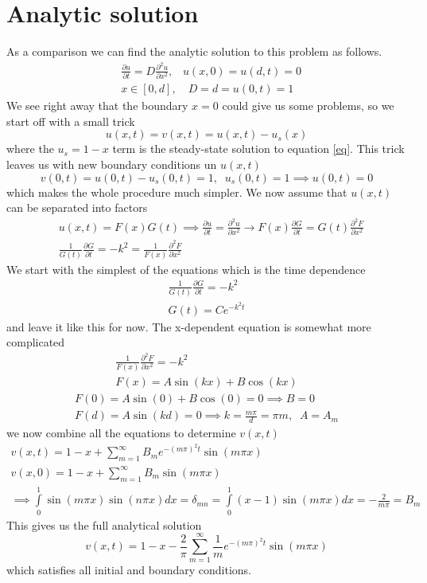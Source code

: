 \documentclass[a4paper,english, 10pt, twoside]{article}
\begin{document}
\section{Analytic solution}
As a comparison we can find the analytic solution to this problem as follows. 
 \begin{align}\label{eq}
  &\frac{\partial u}{\partial t} = D\frac{\partial^2 u}{\partial x^2}, \,\,\,\,\, u(x,0) = u(d,t) = 0\\
  &x\in[0,d],\,\,\,\,\,\, D = d = u(0,t) = 1
 \end{align}
We see right away that the boundary $x=0$ could give us some problems, so we start off with a small trick
$$
u(x,t) = v(x,t) = u(x,t) - u_s(x)
$$
where the $u_s = 1-x$ term is the steady-state solution to equation \ref{eq}. This trick leaves us with new boundary conditions 
un $u(x,t)$ 
$$
v(0,t) = u(0,t) - u_s(0,t) = 1, \;\; u_s(0,t) = 1 \implies u(0,t) = 0
$$
which makes the whole procedure much simpler. We now assume that $u(x,t)$ can be separated into factors 
\begin{align*}
&u(x,t) = F(x)G(t) \implies \frac{\partial u}{\partial t} = \frac{\partial^2 u}{\partial x^2} \to F(x)\frac{\partial G}{\partial t}
= G(t)\frac{\partial^2 F}{\partial x^2}\\
&\frac{1}{G(t)}\frac{\partial G}{\partial t} =-k^2 =  \frac{1}{F(x)}\frac{\partial^2 F}{\partial x^2}
\end{align*}
We start with the simplest of the equations which is the time dependence
\begin{align*}
 \frac{1}{G(t)}\frac{\partial G}{\partial t} =-k^2\\
 G(t) =C e^{-k^2t}
\end{align*}
and leave it like this for now. The x-dependent equation is somewhat more complicated
\begin{align*}
 \frac{1}{F(x)}\frac{\partial^2 F}{\partial x^2} = -k^2 \\
 F(x) = A\sin(kx) + B\cos(kx)
\end{align*}
\begin{align*}
 F(0) = A\sin(0) + B\cos(0) = 0 \implies B= 0\\
 F(d) = A\sin(kd) = 0 \implies k = \frac{m\pi}{d} = \pi m, \;\; A = A_m
\end{align*}
we now combine all the equations to determine $v(x,t)$
\begin{align*}
 v(x,t) = 1-x + \sum\limits_{m=1}^{\infty}B_me^{-(m\pi)^2t}\sin(m\pi x) \\
 v(x,0) = 1-x +\sum\limits_{m=1}^{\infty}B_m\sin(m\pi x)\\
 \implies \int\limits_0^1\sin(m\pi x)\sin(n\pi x)dx = \delta_{mn} = \int\limits_0^1(x-1)\sin(m\pi x)dx = -\frac{2}{m\pi} = B_m
\end{align*}
This gives us the full analytical solution 
\begin{equation}\label{solution}
 v(x,t) = 1-x-\frac{2}{\pi}\sum\limits_{m = 1}^{\infty}\frac{1}{m}e^{-(m\pi)^2t}\sin(m\pi x) 
\end{equation}
which satisfies all initial and boundary conditions.
\end{document}
